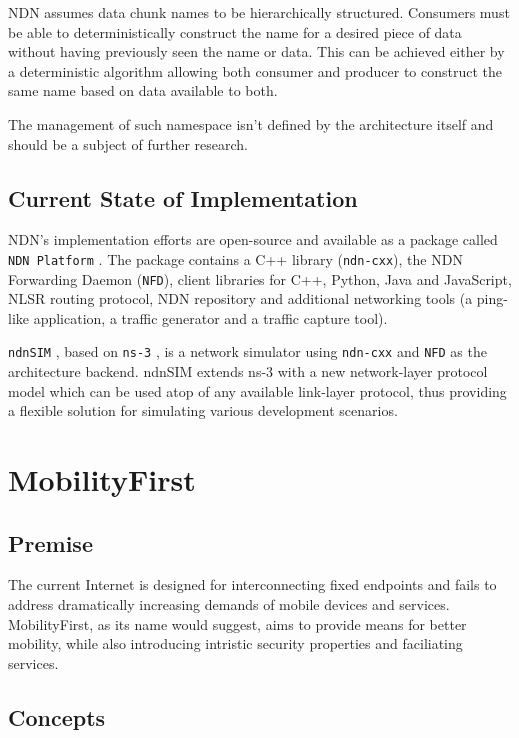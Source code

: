                 NDN assumes data chunk names to be hierarchically structured. Consumers must be able to deterministically construct the name for a desired piece of data without having previously seen the name or data. This can be achieved either by a deterministic algorithm allowing both consumer and producer to construct the same name based on data available to both.

                The management of such namespace isn't defined by the architecture itself and should be a subject of further research.


        \subsection{Current State of Implementation}

            NDN's implementation efforts are open-source and available as a package called \texttt{NDN Platform} \cite{ndn_platform}. The package contains a C++ library (\texttt{ndn-cxx}), the NDN Forwarding Daemon (\texttt{NFD}), client libraries for C++, Python, Java and JavaScript, NLSR routing protocol, NDN repository and additional networking tools (a ping-like application, a traffic generator and a traffic capture tool).

            \texttt{ndnSIM} \cite{ndn_sim}, based on \texttt{ns-3} \cite{ns3}, is a network simulator using \texttt{ndn-cxx} and \texttt{NFD} as the architecture backend. ndnSIM extends ns-3 with a new network-layer protocol model which can be used atop of any available link-layer protocol, thus providing a flexible solution for simulating various development scenarios.


    \section{MobilityFirst}\label{archs:mf}

        \subsection{Premise}

            The current Internet is designed for interconnecting fixed endpoints and fails to address dramatically increasing demands of mobile devices and services. MobilityFirst, as its name would suggest, aims to provide means for better mobility, while also introducing intristic security properties and faciliating services.

        \subsection{Concepts}

